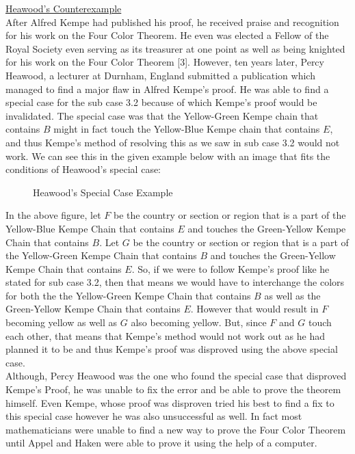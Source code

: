 \documentclass[11pt]{article}
\newcommand{\forceindent}{\leavevmode{\parindent=1.5em\indent}}
\begin{document}
 \noindent \underline{Heawood's Counterexample}\\
 After Alfred Kempe had published his proof, he received praise and recognition for his work on the Four Color Theorem. He even was elected a Fellow of the Royal Society even serving as its treasurer at one point as well as being knighted for his work on the Four Color Theorem [3]. However, ten years later, Percy Heawood, a lecturer at Durnham, England submitted a publication which managed to find a major flaw in Alfred Kempe's proof. He was able to find a special case for the sub case 3.2 because of which Kempe's proof would be invalidated. The special case was that the Yellow-Green Kempe chain that contains $B$ might in fact touch the Yellow-Blue Kempe chain that contains $E$, and thus Kempe's method of resolving this as we saw in sub case 3.2 would not work. We can see this in the given example below with an image that fits the conditions of Heawood's special case:
 
 \begin{figure}[ht!]
\centering
{}
\caption{ Heawood's Special Case Example} 
\end{figure}
 
 In the above figure, let $F$ be the country or section or region that is a part of the Yellow-Blue Kempe Chain that contains $E$ and touches the Green-Yellow Kempe Chain that contains $B$. Let $G$ be the country or section or region that is a part of the Yellow-Green Kempe Chain that contains $B$ and touches the Green-Yellow Kempe Chain that contains $E$. So, if we were to follow Kempe's proof like he stated for sub case 3.2, then that means we would have to interchange the colors for both the the Yellow-Green Kempe Chain that contains $B$ as well as the Green-Yellow Kempe Chain that contains $E$. However that would result in $F$ becoming yellow as well as $G$ also becoming yellow. But, since $F$ and $G$ touch each other, that means that Kempe's method would not work out as he had planned it to be and thus Kempe's proof was disproved using the above special case. \\
 \forceindent Although, Percy Heawood was the one who found the special case that disproved Kempe's Proof, he was unable to fix the error and be able to prove the theorem himself. Even Kempe, whose proof was disproven tried his best to find a fix to this special case however he was also unsuccessful as well. In fact most mathematicians were unable to find a new way to prove the Four Color Theorem until Appel and Haken were able to prove it using the help of a computer.\\
 
\end{document}
